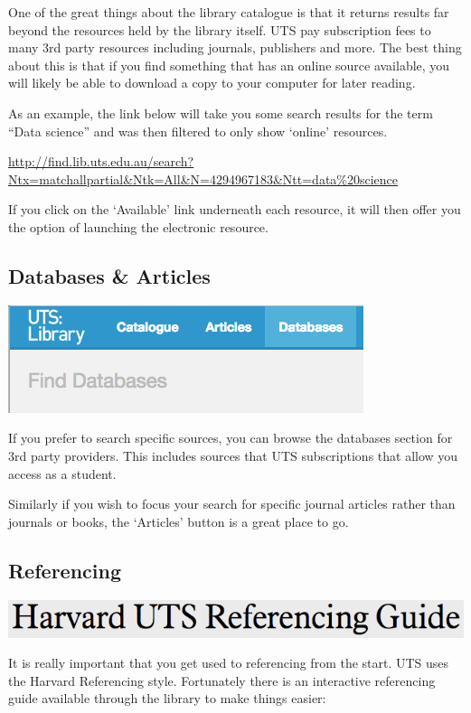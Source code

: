 \documentclass[]{book}
\theoremstyle{definition}
\theoremstyle{definition}
\theoremstyle{remark}
\begin{document}
One of the great things about the library catalogue is that it returns
results far beyond the resources held by the library itself. UTS pay
subscription fees to many 3rd party resources including journals,
publishers and more. The best thing about this is that if you find
something that has an online source available, you will likely be able
to download a copy to your computer for later reading.

As an example, the link below will take you some search results for the
term ``Data science'' and was then filtered to only show `online'
resources.

\url{http://find.lib.uts.edu.au/search?Ntx=matchallpartial\&Ntk=All\&N=4294967183\&Ntt=data\%20science}

If you click on the `Available' link underneath each resource, it will
then offer you the option of launching the electronic resource.

\subsection{Databases \& Articles}\label{databases-articles}

\includegraphics[width=0.4\linewidth]{Images/LibraryDatabases}

If you prefer to search specific sources, you can browse the databases
section for 3rd party providers. This includes sources that UTS
subscriptions that allow you access as a student.

Similarly if you wish to focus your search for specific journal articles
rather than journals or books, the `Articles' button is a great place to
go.

\subsection{Referencing}\label{referencing}

\includegraphics{Images/RefGuide.png}

It is really important that you get used to referencing from the start.
UTS uses the Harvard Referencing style. Fortunately there is an
interactive referencing guide available through the library to make
things easier:
\end{document}
